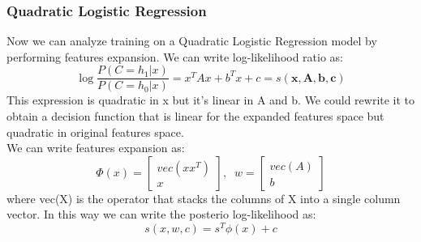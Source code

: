 \documentclass{article}
\begin{document}
\subsubsection{Quadratic Logistic Regression}
Now we can analyze training on a Quadratic Logistic Regression model by performing features expansion. We can write log-likelihood ratio as:
\begin{equation}
    \log{\frac{P(C=h_1|x)}{P(C=h_0|x)}}=x^TAx+b^Tx+c=s(\textbf{x},\textbf{A},\textbf{b},\textbf{c})
\end{equation}
This expression is quadratic in x but it's linear in A and b. We could rewrite it to obtain a decision function that is linear for the expanded features space but quadratic in original features space.\\
We can write features expansion as:
\begin{equation}
    \Phi(x)= 
    \begin{bmatrix}
        vec(xx^T) \\
        x
    \end{bmatrix},
    \;\;
    w=
    \begin{bmatrix}
        vec(A) \\
        b
    \end{bmatrix}
\end{equation}
where vec(X) is the operator that stacks the columns of X into a single column vector. In this way we can write the posterio log-likelihood as:
\begin{equation}
    s(x,w,c)=s^T\phi(x)+c
\end{equation}
\end{document}
